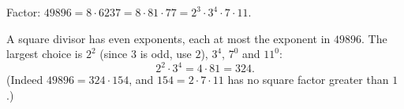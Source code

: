Factor: $49896=8\cdot6237=8\cdot81\cdot77=2^3\cdot3^4\cdot7\cdot11$.

A square divisor has even exponents, each at most the exponent in $49896$. The largest choice is $2^2$ (since $3$ is odd, use $2$), $3^4$, $7^0$ and $11^0$:
\[2^2\cdot3^4=4\cdot81=\boxed{324}.\]
(Indeed $49896=324\cdot154$, and $154=2\cdot7\cdot11$ has no square factor greater than $1$.)
